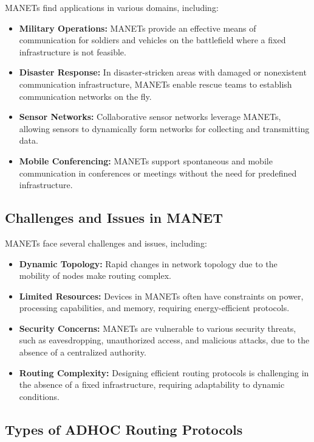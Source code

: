 \documentclass[11pt]{article}
\begin{document}
MANETs find applications in various domains, including:

\begin{itemize}
    \item \textbf{Military Operations:} MANETs provide an effective means of communication for soldiers and vehicles on the battlefield where a fixed infrastructure is not feasible.
    \item \textbf{Disaster Response:} In disaster-stricken areas with damaged or nonexistent communication infrastructure, MANETs enable rescue teams to establish communication networks on the fly.
    \item \textbf{Sensor Networks:} Collaborative sensor networks leverage MANETs, allowing sensors to dynamically form networks for collecting and transmitting data.
    \item \textbf{Mobile Conferencing:} MANETs support spontaneous and mobile communication in conferences or meetings without the need for predefined infrastructure.
\end{itemize}

\subsection{Challenges and Issues in MANET}

MANETs face several challenges and issues, including:

\begin{itemize}
    \item \textbf{Dynamic Topology:} Rapid changes in network topology due to the mobility of nodes make routing complex.
    \item \textbf{Limited Resources:} Devices in MANETs often have constraints on power, processing capabilities, and memory, requiring energy-efficient protocols.
    \item \textbf{Security Concerns:} MANETs are vulnerable to various security threats, such as eavesdropping, unauthorized access, and malicious attacks, due to the absence of a centralized authority.
    \item \textbf{Routing Complexity:} Designing efficient routing protocols is challenging in the absence of a fixed infrastructure, requiring adaptability to dynamic conditions.
\end{itemize}

\subsection{Types of ADHOC Routing Protocols}
\end{document}
